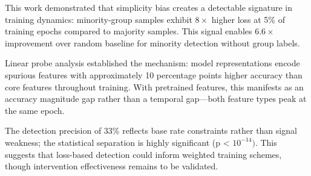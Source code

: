 
This work demonstrated that simplicity bias creates a detectable signature in training dynamics: minority-group samples exhibit $8\times$ higher loss at 5\% of training epochs compared to majority samples. This signal enables 6.$6\times$ improvement over random baseline for minority detection without group labels.

Linear probe analysis established the mechanism: model representations encode spurious features with approximately 10 percentage points higher accuracy than core features throughout training. With pretrained features, this manifests as an accuracy magnitude gap rather than a temporal gap---both feature types peak at the same epoch.

The detection precision of 33\% reflects base rate constraints rather than signal weakness; the statistical separation is highly significant (p < $10^{-14})$. This suggests that loss-based detection could inform weighted training schemes, though intervention effectiveness remains to be validated.

